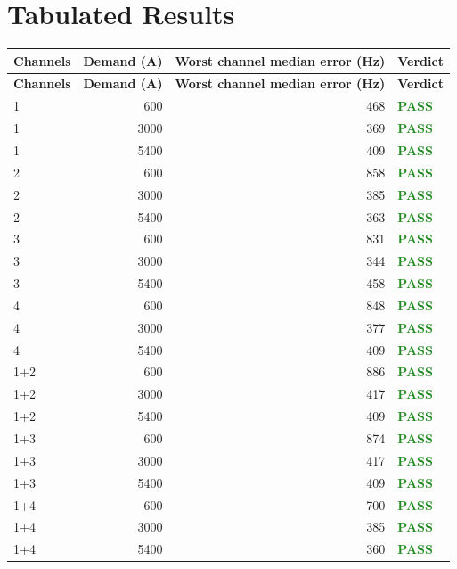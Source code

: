 \documentclass[11pt]{article}
\begin{document}
\section*{Tabulated Results}
\begin{longtable}{l r r l}
\hline
\textbf{Channels} & \textbf{Demand (A)} & \textbf{Worst channel median error (Hz)} & \textbf{Verdict} \\
\hline
\endfirsthead
\hline
\textbf{Channels} & \textbf{Demand (A)} & \textbf{Worst channel median error (Hz)} & \textbf{Verdict} \\
\hline
\endhead
1 & 600 & 468 & \textcolor{ForestGreen}{\textbf{PASS}} \\
1 & 3000 & 369 & \textcolor{ForestGreen}{\textbf{PASS}} \\
1 & 5400 & 409 & \textcolor{ForestGreen}{\textbf{PASS}} \\
2 & 600 & 858 & \textcolor{ForestGreen}{\textbf{PASS}} \\
2 & 3000 & 385 & \textcolor{ForestGreen}{\textbf{PASS}} \\
2 & 5400 & 363 & \textcolor{ForestGreen}{\textbf{PASS}} \\
3 & 600 & 831 & \textcolor{ForestGreen}{\textbf{PASS}} \\
3 & 3000 & 344 & \textcolor{ForestGreen}{\textbf{PASS}} \\
3 & 5400 & 458 & \textcolor{ForestGreen}{\textbf{PASS}} \\
4 & 600 & 848 & \textcolor{ForestGreen}{\textbf{PASS}} \\
4 & 3000 & 377 & \textcolor{ForestGreen}{\textbf{PASS}} \\
4 & 5400 & 409 & \textcolor{ForestGreen}{\textbf{PASS}} \\
1+2 & 600 & 886 & \textcolor{ForestGreen}{\textbf{PASS}} \\
1+2 & 3000 & 417 & \textcolor{ForestGreen}{\textbf{PASS}} \\
1+2 & 5400 & 409 & \textcolor{ForestGreen}{\textbf{PASS}} \\
1+3 & 600 & 874 & \textcolor{ForestGreen}{\textbf{PASS}} \\
1+3 & 3000 & 417 & \textcolor{ForestGreen}{\textbf{PASS}} \\
1+3 & 5400 & 409 & \textcolor{ForestGreen}{\textbf{PASS}} \\
1+4 & 600 & 700 & \textcolor{ForestGreen}{\textbf{PASS}} \\
1+4 & 3000 & 385 & \textcolor{ForestGreen}{\textbf{PASS}} \\
1+4 & 5400 & 360 & \textcolor{ForestGreen}{\textbf{PASS}} \\

\end{longtable}
\end{document}
